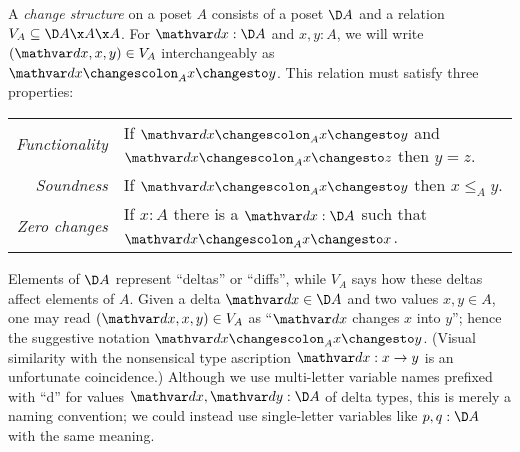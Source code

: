 \begin{definition}
  A \emph{change structure} on a poset $A$ consists of a poset $\D A$ and a
  relation $V_A \subseteq \D A \x A \x A$. For $\dx : \D A$ and $x, y : A$, we will write $(\dx, x, y) \in V_A$ interchangeably as $\changesat A {\dx} x y$. This relation must satisfy three properties:

  \newlength{\wubwubwub}
  \setlength{}
  \vspace{2\wubwubwub}
  \def\arraystretch{1}
  \begin{tabular}{rp{30em}}
    \emph{Functionality} & If $\changesat A {\dx} x y$ and $\changesat A {\dx} x z$ then $y = z$.
    \\[\wubwubwub]
    \emph{Soundness} & If $\changesat A {\dx} x y$ then $x \le_A y$.
    \\[\wubwubwub]
    \emph{Zero changes} & If $x : A$ there is a $\dx : \D A$ such that $\changesat A {\dx} x x$.
  \end{tabular}
\end{definition}


\noindent
Elements of $\D A$ represent ``deltas'' or ``diffs'', while $V_A$ says how these deltas affect elements of $A$.
%
Given a delta $\dx \in \D A$ and two values $x,y \in A$, one may read $(\dx, x, y) \in V_A$ as ``$\dx$ changes $x$ into $y$''; hence the suggestive notation $\changesat A {\dx} x y$.
%
(Visual similarity with the nonsensical type ascription $\dx : x \to y$ is an unfortunate coincidence.)
%
Although we use multi-letter variable names prefixed with ``d'' for values $\dx,\dy : \D A$ of delta types, this is merely a naming convention; we could instead use single-letter variables like $p,q : \D A$ with the same meaning.



